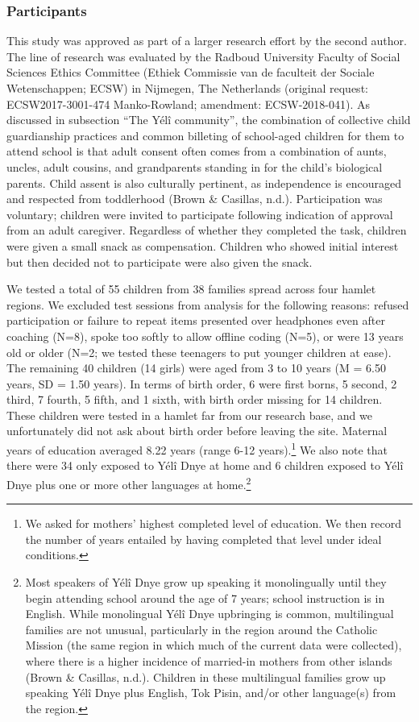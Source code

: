 \documentclass[english,,man,floatsintext]{apa6}
\begin{document}
\hypertarget{participants}{%
\subsubsection{Participants}\label{participants}}

This study was approved as part of a larger research effort by the second author. The line of research was evaluated by the Radboud University Faculty of Social Sciences Ethics Committee (Ethiek Commissie van de faculteit der Sociale Wetenschappen; ECSW) in Nijmegen, The Netherlands (original request: ECSW2017-3001-474 Manko-Rowland; amendment: ECSW-2018-041). As discussed in subsection \enquote{The Yélî community}, the combination of collective child guardianship practices and common billeting of school-aged children for them to attend school is that adult consent often comes from a combination of aunts, uncles, adult cousins, and grandparents standing in for the child's biological parents. Child assent is also culturally pertinent, as independence is encouraged and respected from toddlerhood (Brown \& Casillas, n.d.). Participation was voluntary; children were invited to participate following indication of approval from an adult caregiver. Regardless of whether they completed the task, children were given a small snack as compensation. Children who showed initial interest but then decided not to participate were also given the snack.

We tested a total of 55 children from 38 families spread across four hamlet regions. We excluded test sessions from analysis for the following reasons: refused participation or failure to repeat items presented over headphones even after coaching (N=8), spoke too softly to allow offline coding (N=5), or were 13 years old or older (N=2; we tested these teenagers to put younger children at ease). The remaining 40 children (14 girls) were aged from 3 to 10 years (M = 6.50 years, SD = 1.50 years). In terms of birth order, 6 were first borns, 5 second, 2 third, 7 fourth, 5 fifth, and 1 sixth, with birth order missing for 14 children. These children were tested in a hamlet far from our research base, and we unfortunately did not ask about birth order before leaving the site. Maternal years of education averaged 8.22 years (range 6-12 years).\footnote{We asked for mothers' highest completed level of education. We then record the number of years entailed by having completed that level under ideal conditions.} We also note that there were 34 only exposed to Yélî Dnye at home and 6 children exposed to Yélî Dnye plus one or more other languages at home.\footnote{Most speakers of Yélî Dnye grow up speaking it monolingually until they begin attending school around the age of 7 years; school instruction is in English. While monolingual Yélî Dnye upbringing is common, multilingual families are not unusual, particularly in the region around the Catholic Mission (the same region in which much of the current data were collected), where there is a higher incidence of married-in mothers from other islands (Brown \& Casillas, n.d.). Children in these multilingual families grow up speaking Yélî Dnye plus English, Tok Pisin, and/or other language(s) from the region.}
\end{document}
